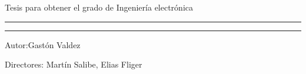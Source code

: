 \begin{titlepage}
{	
\begin{center}
 \large{Tesis para obtener el grado de Ingeniería electrónica}
\end{center}
}

\rule{\linewidth}{1mm}
{
\begin{center}
	\fontsize{20}{0}{\selectfont{Facultad de ingeniería}}
\end{center}
}
\rule{1\linewidth}{1mm} 	
{
 \LARGE Autor:Gastón Valdez \par 
 \LARGE Directores: Martín Salibe, Elias Fliger\par  
} 
\end{titlepage}